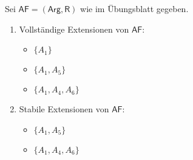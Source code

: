 Sei $\mathsf{AF}=(\mathsf{Arg}, \mathsf{R})$ wie im Übungsblatt gegeben.

\begin{enumerate}
	\item Vollständige Extensionen von $\mathsf{AF}$:
	\begin{itemize}
		\item $\{A_1\}$
		\item $\{A_1, A_5\}$
		\item $\{A_1, A_4, A_6\}$
	\end{itemize}
	
	\item Stabile Extensionen von $\mathsf{AF}$:
	\begin{itemize}
		\item $\{A_1, A_5\}$
		\item $\{A_1, A_4, A_6\}$
	\end{itemize}
\end{enumerate}
